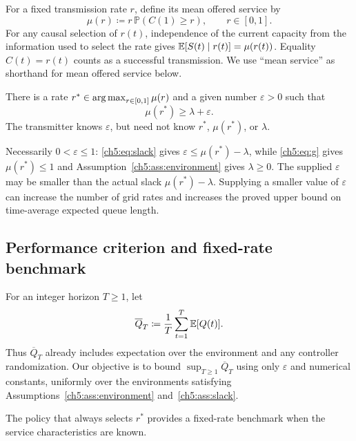 For a fixed transmission rate $r$, define its mean offered service by
\begin{equation}
 \mu(r)\coloneqq r\,\mathbb P(C(1)\ge r),\qquad r\in[0,1].
 \label{ch5:eq:g}
\end{equation}
For any causal selection of $r(t)$, independence of the current capacity
from the information used to select the rate gives
$\mathbb{E}[S(t)\mid r(t)]=\mu(r(t))$.
Equality $C(t)=r(t)$ counts as a successful transmission.
We use ``mean service'' as shorthand for mean offered service below.

\begin{Thm:Assumption}
\label{ch5:ass:slack}
There is a rate $r^*\in\operatorname*{arg\,max}_{r\in[0,1]}\mu(r)$ and a given number
$\varepsilon>0$ such that
\begin{equation}
 \mu(r^*)\ge\lambda+\varepsilon.
 \label{ch5:eq:slack}
\end{equation}
The transmitter knows $\varepsilon$, but need not know $r^*$, $\mu(r^*)$,
or $\lambda$.
\end{Thm:Assumption}

Necessarily $0<\varepsilon\le1$: \eqref{ch5:eq:slack} gives
$\varepsilon\le \mu(r^*)-\lambda$, while \eqref{ch5:eq:g} gives $\mu(r^*)\le1$
and Assumption~\ref{ch5:ass:environment} gives $\lambda\ge0$.
The supplied $\varepsilon$ may be smaller than the actual slack
$\mu(r^*)-\lambda$. Supplying a smaller value of $\varepsilon$ can increase
the number of grid rates and increases the proved upper bound on
time-average expected queue length.

\subsection{Performance criterion and fixed-rate benchmark}

For an integer horizon $T\ge1$, let
\begin{equation}
 \overline Q_T\coloneqq\frac1T\sum_{t=1}^{T}\mathbb{E}[Q(t)].
 \label{ch5:eq:performance}
\end{equation}
Thus $\overline Q_T$ already includes expectation over the environment
and any controller randomization.
Our objective is to bound $\sup_{T\ge1}\overline Q_T$ using only
$\varepsilon$ and numerical constants, uniformly over the environments
satisfying Assumptions~\ref{ch5:ass:environment} and~\ref{ch5:ass:slack}.

The policy that always selects $r^*$ provides a fixed-rate benchmark
when the service characteristics are known.

